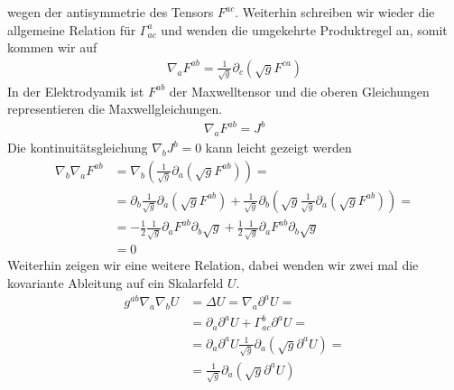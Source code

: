 \documentclass[a4paper]{article}
\begin{document}
wegen der antisymmetrie des Tensors $F^{ac}$. Weiterhin schreiben wir
wieder die allgemeine Relation für $\Gamma ^{a}_{ac}$ und wenden
die umgekehrte Produktregel an, somit kommen wir auf
\begin{align}
    \nabla_a F^{ab} =  \frac{1}{\sqrt{g}} \partial_c(\sqrt{g}F^{ca})
\end{align}
In der Elektrodyamik ist $F^{ab}$ der Maxwelltensor und die oberen
Gleichungen representieren die Maxwellgleichungen.
\begin{align}
    \nabla_a F^{ab} = J^b
\end{align}
Die kontinuitätsgleichung $\nabla_b J^b = 0$ kann leicht gezeigt werden
\begin{align}
    \nabla_b \nabla_a F^{ab} &= \nabla_b(\frac{1}{\sqrt{g}}
    \partial_a(\sqrt{g}F^{ab})) =\\
    &= \partial_b \frac{1}{\sqrt{g}} \partial_a(\sqrt{g}F^{ab})+
    \frac{1}{\sqrt{g}}
    \partial_b (\sqrt{g}\frac{1}{\sqrt{g}}\partial_a(\sqrt{g} F^{ab}))=\\
    &=-\frac{1}{2}\frac{1}{\sqrt{g}}\partial_a F^{ab}\partial_b
    \sqrt{g} + \frac{1}{2} \frac{1}{\sqrt{g}} \partial_a F^{ab} \partial_b
    \sqrt{g} \\
    &= 0
\end{align}
Weiterhin zeigen wir eine weitere Relation, dabei wenden wir zwei mal die
kovariante Ableitung auf ein Skalarfeld $U$.
\begin{align}
    g^{ab}\nabla_a\nabla_b U &= \Delta U = \nabla_a \partial^a U =\\
    &= \partial_a \partial^a U + \Gamma^{b}_{ac} \partial^a U =\\
    &= \partial_a\partial^a U
    \frac{1}{\sqrt{g}}\partial_a(\sqrt{g}\partial^a U) = \\
    &= \frac{1}{\sqrt{g}} \partial_a(\sqrt{g} \partial^a U)
\end{align}
\end{document}
